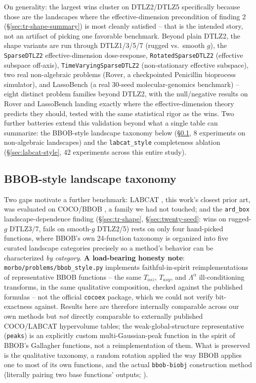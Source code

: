 \documentclass[11pt]{article}
\begin{document}
On generality: the largest wins cluster on DTLZ2/DTLZ5 specifically
because those are the landscapes where the effective-dimension
precondition of finding 2 (\S\ref{sec:tr-shape-summary}) is most cleanly
satisfied -- that is the intended story, not an artifact of picking one
favorable benchmark. Beyond plain DTLZ2, the shape variants are run
through DTLZ1/3/5/7 (rugged vs.\ smooth $g$), the \texttt{SparseDTLZ2}
effective-dimension dose-response, \texttt{RotatedSparseDTLZ2} (effective
subspace off-axis), \texttt{TimeVaryingSparseDTLZ2} (non-stationary
effective subspace), two real non-algebraic problems (Rover, a
checkpointed Penicillin bioprocess simulator), and LassoBench (a real
30-seed molecular-genomics benchmark) -- eight distinct problem families
beyond DTLZ2, with the null/negative results on Rover and LassoBench
landing exactly where the effective-dimension theory predicts they should,
tested with the same statistical rigor as the wins. Two further batteries
extend this validation beyond what a single table can summarize: the
BBOB-style landscape taxonomy below (\S\ref{sec:bbob-style}, 8
experiments on non-algebraic landscapes) and the \texttt{labcat\_style}
completeness ablation (\S\ref{sec:labcat-style}, 42 experiments across
this entire study).

\subsection{BBOB-style landscape taxonomy}
\label{sec:bbob-style}

Two gaps motivate a further benchmark: LABCAT \citep{visser2023labcat},
this work's closest prior art, was evaluated on COCO/BBOB
\citep{hansen2021coco}, a family we had not touched; and the
\texttt{ard\_box} landscape-dependence finding
(\S\ref{sec:tr-shape}, \S\ref{sec:twenty-seed}: wins on rugged-$g$
DTLZ3/7, fails on smooth-$g$ DTLZ2/5) rests on only four hand-picked
functions, where BBOB's own 24-function taxonomy is organized into five
curated landscape categories precisely so a method's behavior can be
characterized \emph{by category}. \textbf{A load-bearing honesty note}:
\texttt{morbo/problems/bbob\_style.py} implements faithful-in-spirit
reimplementations of representative BBOB functions -- the same $T_{osz}$,
$T_{asy}$, and $\Lambda^{\alpha}$ ill-conditioning transforms, in the same
qualitative composition, checked against the published formulas -- not the
official \texttt{cocoex} package, which we could not verify bit-exactness
against. Results here are therefore internally comparable across our own
methods but \emph{not} directly comparable to externally published
COCO/LABCAT hypervolume tables; the weak-global-structure representative
(\texttt{peaks}) is an explicitly custom multi-Gaussian-peak function in
the spirit of BBOB's Gallagher functions, not a reimplementation of them.
What is preserved is the qualitative taxonomy, a random rotation applied
the way BBOB applies one to most of its own functions, and the actual
\texttt{bbob-biobj} construction method (literally pairing two base
functions' outputs; \citealp{tusar2016bbobbiobj}).
\end{document}

